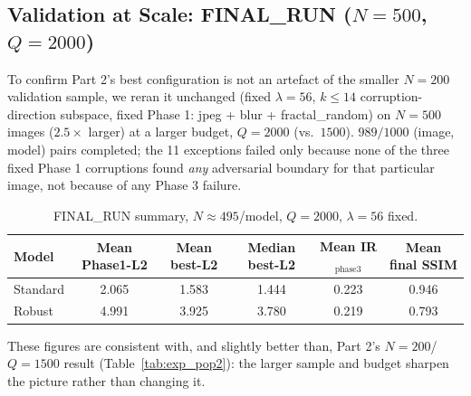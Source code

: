 \documentclass[11pt, a4paper]{article}
\begin{document}
\subsection{Validation at Scale: FINAL\_RUN ($N=500$, $Q=2000$)}
\label{sec:final_run}

To confirm Part 2's best configuration is not an artefact of the smaller $N=200$ validation sample, we reran it unchanged (fixed $\lambda=56$, $k\leq14$ corruption-direction subspace, fixed Phase 1: jpeg + blur + fractal\_random) on $N=500$ images ($2.5\times$ larger) at a larger budget, $Q=2000$ (vs.\ $1500$). $989/1000$ (image, model) pairs completed; the 11 exceptions failed only because none of the three fixed Phase 1 corruptions found \emph{any} adversarial boundary for that particular image, not because of any Phase 3 failure.

\begin{table}[htbp]
\centering
\caption{FINAL\_RUN summary, $N\approx495$/model, $Q=2000$, $\lambda=56$ fixed.}
\label{tab:final_run}
\begin{tabular}{lccccc}
\toprule
Model & Mean Phase1-L2 & Mean best-L2 & Median best-L2 & Mean IR$_\text{phase3}$ & Mean final SSIM \\
\midrule
Standard & 2.065 & 1.583 & 1.444 & 0.223 & 0.946 \\
Robust   & 4.991 & 3.925 & 3.780 & 0.219 & 0.793 \\
\bottomrule
\end{tabular}
\end{table}

These figures are consistent with, and slightly better than, Part 2's $N=200$/$Q=1500$ result (Table~\ref{tab:exp_pop2}): the larger sample and budget sharpen the picture rather than changing it.
\end{document}
